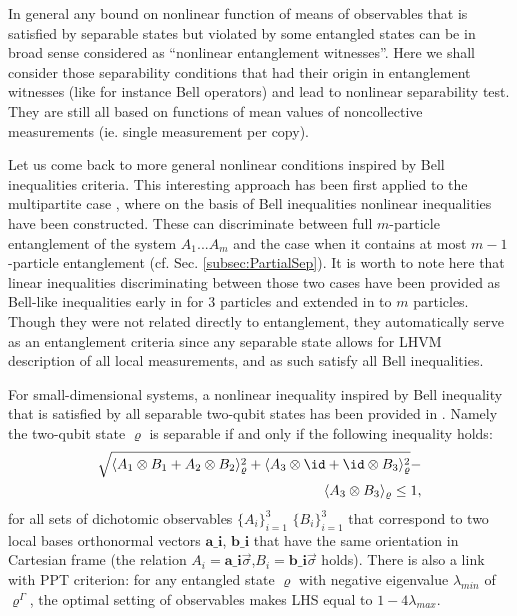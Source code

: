 \documentclass[rmp,12pt,preprint]{revtex4-2}
\begin{document}
In general any bound on nonlinear function of means of observables
that is satisfied by separable states but violated by some entangled
states can be in broad sense considered as ``nonlinear entanglement
witnesses''. Here we shall consider those separability conditions that
had their origin in entanglement witnesses (like for instance Bell
operators) and lead to nonlinear separability test. They are still all
based on functions of mean values of noncollective measurements
(ie. single measurement per copy).

Let us come back to more general nonlinear conditions inspired by Bell
inequalities criteria. This interesting approach has been first
applied to the multipartite case \cite{MaasssenU1988}, where on the
basis of Bell inequalities nonlinear inequalities have been
constructed.  These can discriminate between full $m$-particle
entanglement of the system $A_{1}...A_{m}$ and the case when it
contains at most $m-1$-particle entanglement
(cf. Sec. \ref{subsec:PartialSep}).  It is worth to note here that
linear inequalities discriminating between those two cases have been
provided as Bell-like inequalities early in \cite{Svetlichny1} for $3$
particles and extended in \cite{Svetlichny} to $m$ particles. Though
they were not related directly to entanglement, they automatically
serve as an entanglement criteria since any separable state allows for
LHVM description of all local measurements, and as such satisfy all
Bell inequalities.

For small-dimensional systems, a nonlinear inequality inspired by Bell
inequality that is satisfied by all separable two-qubit states has
been provided in \cite{Yu}. Namely the two-qubit state $\varrho$ is
separable if and only if the following inequality holds:
\begin{eqnarray}
\sqrt{\langle A_1\otimes B_1 + A_2\otimes B_2\rangle_{\varrho}
^{2}
+ \langle A_3\otimes \id + \id \otimes B_3\rangle^{2}_\varrho} -  \nonumber \\
\langle A_3\otimes B_3\rangle_\varrho \leq 1,
\end{eqnarray}
for all sets of
dichotomic observables $\{ A_{i} \}_{i=1}^{3}$ $\{ B_{i}
\}_{i=1}^{3}$ that correspond to two local bases orthonormal vectors
$\textbf{a_{i}}$, $\textbf{b_{i}}$ that have the same
orientation in Cartesian frame (the relation
$A_{i}=\textbf{{a}_{i}}\vec{\sigma}$,$B_{i}=\textbf{{b}_{i}}\vec{\sigma}$
holds). There is also a link with PPT criterion: for any entangled
state $\varrho$ with negative eigenvalue $\lambda_{min}$ of
$\varrho^{\Gamma}$, the optimal setting of observables makes LHS
equal to $1-4\lambda_{max}$.
\end{document}
